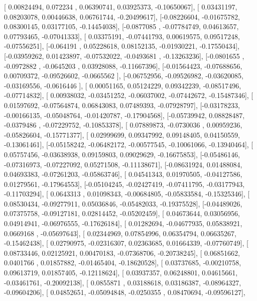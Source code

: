 \documentclass{article}
\begin{document}
       [ 0.00824494,  0.072234  ,  0.06390741,  0.03925373, -0.10650067],
       [ 0.03431197,  0.08203078,  0.00446638,  0.06761744, -0.20499617],
       [-0.08226604, -0.01675782,  0.08300145,  0.03177105, -0.14454038],
       [-0.0877085 , -0.07784749,  0.04613657,  0.07793465, -0.07041333],
       [ 0.03375191, -0.07441793,  0.00619575,  0.09517248, -0.07556251],
       [-0.064191  ,  0.05228618,  0.08152135, -0.01930221, -0.17550434],
       [-0.03959262,  0.01423897, -0.07532022, -0.0493681 , -0.13263236],
       [-0.0801655 , -0.0972882 , -0.0645203 ,  0.03928088, -0.11667396],
       [-0.01564423, -0.07688656,  0.00709372, -0.09526602, -0.0665562 ],
       [-0.06752956, -0.09526982, -0.03620085, -0.03169556, -0.0616446 ],
       [ 0.00051165,  0.05124229,  0.09342239, -0.08517496, -0.07714832],
       [ 0.00938032, -0.03451252, -0.06037002, -0.07442672, -0.15487346],
       [ 0.01597692, -0.07564874,  0.06843083,  0.07489393, -0.07928797],
       [-0.03178233, -0.00166135, -0.05048764, -0.01420787, -0.17904568],
       [-0.05739942,  0.08828487, -0.0379486 , -0.07229752, -0.10853378],
       [ 0.07889873, -0.0730036 ,  0.00959236, -0.05826604, -0.15771377],
       [ 0.02999699,  0.09347992,  0.09148405,  0.04150559, -0.13061461],
       [-0.05158242, -0.06482172, -0.00577545, -0.10061066, -0.13940464],
       [ 0.05757456, -0.03638938,  0.09159803,  0.09029629, -0.16675853],
       [-0.05486146, -0.07316973, -0.07227092,  0.05271508, -0.11138671],
       [-0.08631924,  0.01488084,  0.04693383, -0.07261203, -0.05863746],
       [ 0.04541343,  0.01970505, -0.04127586,  0.01279561, -0.17964553],
       [-0.05104245, -0.02427419, -0.07411795, -0.03177943, -0.11703294],
       [ 0.0643313 ,  0.01098343, -0.00684805, -0.05833584, -0.15325346],
       [ 0.08530434, -0.09277911,  0.05036846, -0.05482033, -0.19375528],
       [-0.04489026,  0.07375758, -0.09127181,  0.02814452, -0.05202459],
       [ 0.04673644,  0.03056956,  0.04914941, -0.06976555, -0.17626184],
       [ 0.01282694, -0.04677935,  0.05838921,  0.0669168 , -0.05697643],
       [ 0.02344969,  0.07854996,  0.06354794,  0.06635267, -0.15462438],
       [ 0.02790975, -0.02316307,  0.02363685,  0.01664339, -0.07760749],
       [ 0.08733446,  0.02125921,  0.00470183, -0.07368706, -0.20738245],
       [ 0.06851662,  0.0401766 ,  0.01857882, -0.01465404, -0.18620528],
       [ 0.03737685, -0.00210758,  0.09613719,  0.01857405, -0.12118624],
       [ 0.03937357,  0.06248801,  0.04615661, -0.03461761, -0.20092138],
       [ 0.0855871 ,  0.03188618,  0.03186387, -0.08964327, -0.09604206],
       [ 0.04852651, -0.05094848, -0.0250355 ,  0.08470694, -0.09596127],
\end{document}

